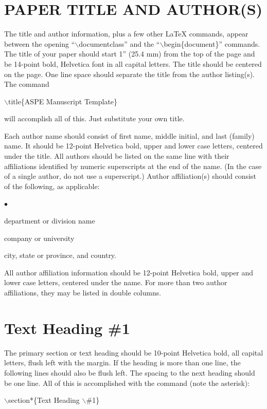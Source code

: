 \documentclass[letterpaper,10pt,twocolumn]{../aspe}
\begin{document}
\section*{PAPER TITLE AND AUTHOR(S)}
The title and author information, plus a few other LaTeX commands, appear between the opening ``$\backslash$documentclass'' and the ``$\backslash$begin\{document\}''
commands.  The title of your paper should start 1'' (25.4 mm) from the top
of the page and be 14-point bold, Helvetica font in all capital letters.
The title should be centered on the page. One line space should separate
the title from the author listing(s).  The command

\hspace*{3mm}$\backslash$title\{ASPE Manuscript Template\}

will accomplish all of this.  Just substitute your own title.

Each author name should consist of first name, middle initial, and last
(family) name. It should be 12-point Helvetica bold, upper and lower case
letters, centered under the title. All authors should be listed on the same
line with their affiliations identified by numeric superscripts at the end
of the name.  (In the case of a single author, do not use a superscript.)
Author affiliation(s) should consist of the following, as applicable:
\begin{list}{$\bullet$}{\parsep=0pt\parskip=0pt}
    \item department or division name
    \item company or university
    \item city, state or province, and country.
\end{list}
All author affiliation information should be 12-point Helvetica bold, upper
and lower case letters, centered under the name. For more than two author
affiliations, they may be listed in double columns.

\section*{Text Heading \#1}
The primary section or text heading should be 10-point Helvetica bold, all
capital letters, flush left with the margin. If the heading is more than
one line, the following lines should also be flush left. The spacing to the
next heading should be one line.  All of this is accomplished with the
command (note the asterisk):

\hspace*{3mm}$\backslash$section*\{Text Heading $\backslash$\#1\}
\end{document}
